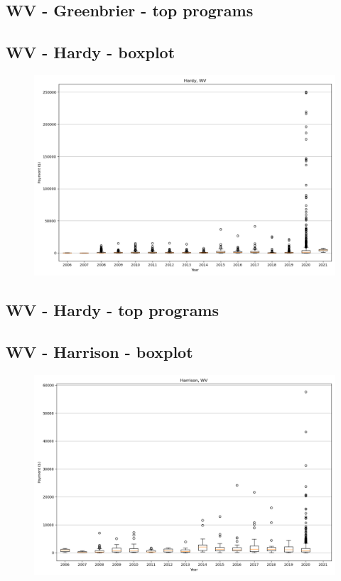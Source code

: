 \subsection*{WV - Greenbrier - top programs}

\newpage
\subsection*{WV - Hardy - boxplot}
\begin{figure}[h]
\centering
\includegraphics[width=7in]{../output/boxplots/counties/Hardy-WV_boxplot.png}
\end{figure}


\subsection*{WV - Hardy - top programs}

\newpage
\subsection*{WV - Harrison - boxplot}
\begin{figure}[h]
\centering
\includegraphics[width=7in]{../output/boxplots/counties/Harrison-WV_boxplot.png}
\end{figure}



